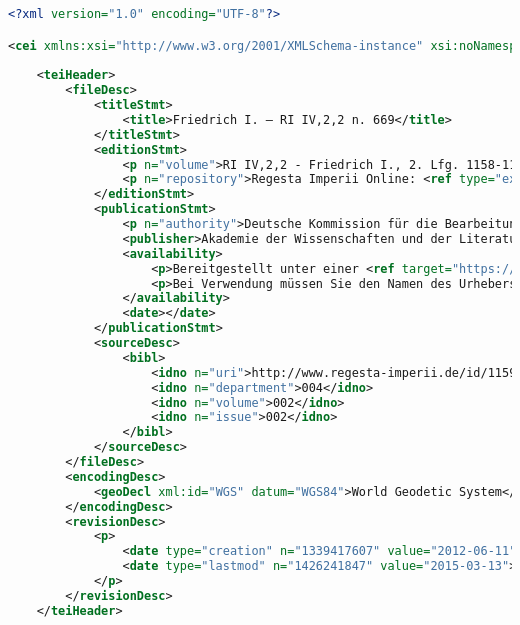 

\lstset{style=mystyle}
\begin{lstlisting}[language=XML]
<?xml version="1.0" encoding="UTF-8"?>

<cei xmlns:xsi="http://www.w3.org/2001/XMLSchema-instance" xsi:noNamespaceSchemaLocation="http://www.cei.lmu.de/schema/cei060122.xsd">
		
	<teiHeader>
		<fileDesc>
			<titleStmt>
				<title>Friedrich I. – RI IV,2,2 n. 669</title>
			</titleStmt>
			<editionStmt>
				<p n="volume">RI IV,2,2 - Friedrich I., 2. Lfg. 1158-1168</p>
				<p n="repository">Regesta Imperii Online: <ref type="external" target="http://www.regesta-imperii.de/cei/004-002-002/sources/1159-02-15_1_0_4_2_2_111_669"></ref></p>
			</editionStmt>
			<publicationStmt>
				<p n="authority">Deutsche Kommission für die Bearbeitung der Regesta Imperii e.V. bei der Akademie der Wissenschaften und der Literatur | Mainz</p>
				<publisher>Akademie der Wissenschaften und der Literatur |Mainz – Digitale Akademie</publisher>
				<availability>
					<p>Bereitgestellt unter einer <ref target="https://creativecommons.org/licenses/by/4.0/">Creative Commons Namensnennung (CC BY 4.0)</ref></p>
					<p>Bei Verwendung müssen Sie den Namen des Urhebers und folgenden Link zum Material angeben: <ref type="external" target="http://www.regesta-imperii.de/cei/004-002-002/sources/1159-02-15_1_0_4_2_2_111_669"></ref></p>
				</availability>
				<date></date>
			</publicationStmt>
			<sourceDesc>
				<bibl>
					<idno n="uri">http://www.regesta-imperii.de/id/1159-02-15_1_0_4_2_2_111_669</idno>
					<idno n="department">004</idno>
					<idno n="volume">002</idno>
					<idno n="issue">002</idno>
				</bibl>
			</sourceDesc>
		</fileDesc>
		<encodingDesc>
			<geoDecl xml:id="WGS" datum="WGS84">World Geodetic System</geoDecl>
		</encodingDesc>
		<revisionDesc>
			<p>
				<date type="creation" n="1339417607" value="2012-06-11"></date>
				<date type="lastmod" n="1426241847" value="2015-03-13"></date>
			</p>
		</revisionDesc>
	</teiHeader>


\end{lstlisting}
